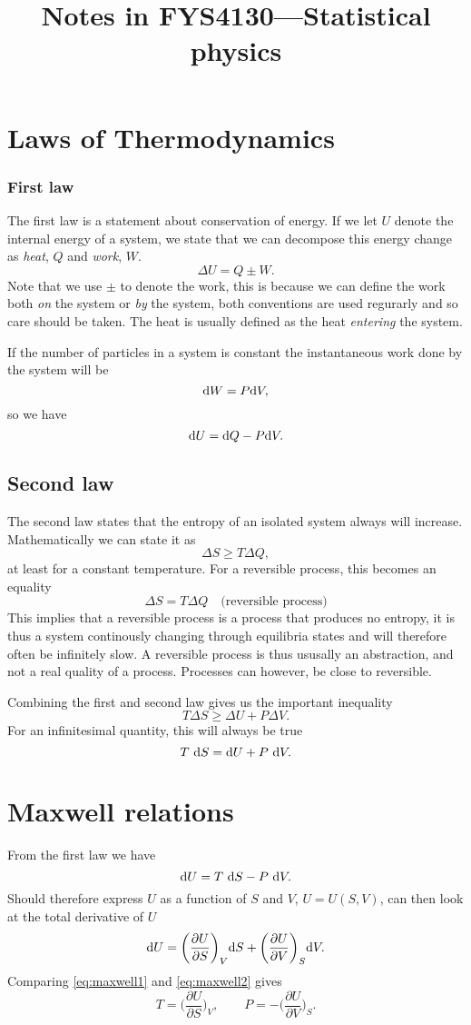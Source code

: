 \documentclass[a4paper, 11pt, notitlepage, english]{article}
\author{}
\title{Notes in FYS4130---Statistical physics}
\newcommand{\beq}{\begin{equation}}
\newcommand{\eeq}{\end{equation}}
\renewcommand{\d}{{\rm d}}
\newcommand{\p}{\partial}
\begin{document}
\section*{Laws of Thermodynamics}

\subsubsection*{First law}
The first law is a statement about conservation of energy. If we let $U$ denote the internal energy of a system, we state that we can decompose this energy change as \emph{heat}, $Q$ and \emph{work}, $W$.
$$\Delta U = Q \pm W.$$
Note that we use $\pm$ to denote the work, this is because we can define the work both \emph{on} the system or \emph{by} the system, both conventions are used regurarly and so care should be taken. The heat is usually defined as the heat \emph{entering} the system.

If the number of particles in a system is constant the instantaneous work done by the system will be 
$$\d W = P \d V,$$
so we have
$$\d U = \d Q - P \d V.$$

\subsection*{Second law}
The second law states that the entropy of an isolated system always will increase. Mathematically we can state it as
$$\Delta S \geq T\Delta Q,$$
at least for a constant temperature. For a reversible process, this becomes an equality
$$\Delta S = T \Delta Q \quad \mbox{(reversible process)} $$
This implies that a reversible process is a process that produces no entropy, it is thus a system continously changing through equilibria states and will therefore often be 
infinitely slow. A reversible process is thus ususally an abstraction, and not a real quality of a process. Processes can however, be close to reversible.

Combining the first and second law gives us the important inequality
$$T\Delta S \geq \Delta U + P\Delta V.$$
For an infinitesimal quantity, this will always be true
$$T\ \d S = \d U + P\ \d V.$$

\clearpage

\section*{Maxwell relations}
From the first law we have
\beq \d U = T\ \d S - P\ \d V. \eeq \label{eq:maxwell1}
Should therefore express $U$ as a function of $S$ and $V$, $U = U(S,V)$, can then look at the total derivative of $U$
\beq \d U = \bigg(\frac{\p U}{\p S}\bigg)_V \d S + \bigg(\frac{\p U}{\p V}\bigg)_S \d V. \eeq \label{eq:maxwell2}
Comparing \ref{eq:maxwell1} and \ref{eq:maxwell2} gives
$$T = \bigg(\frac{\p U}{\p S}\bigg)_V, \qquad P = -\bigg(\frac{\p U}{\p V}\bigg)_S.$$
\end{document}
